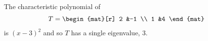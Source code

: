 \begin{example}   \label{ex:SingJordBlock}
The characteristic polynomial of
\begin{equation*}
  T=\begin{mat}[r]
      2  &-1  \\
      1  &4
    \end{mat}
\end{equation*}
is \( (x-3)^2 \) and so \( T \) has a single eigenvalue, \( 3 \).


\end{example}
